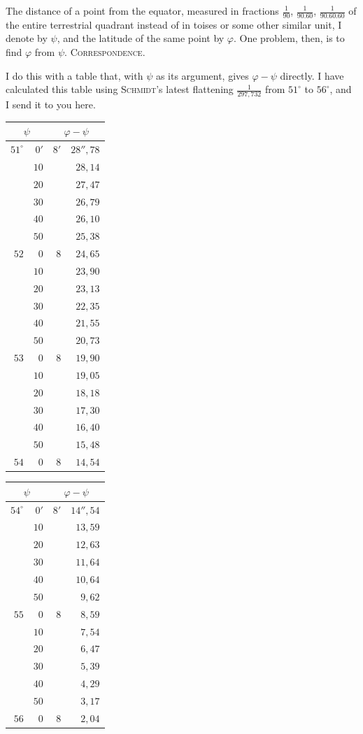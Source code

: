 The distance of a point from the equator, measured in fractions $\frac1{90}$, $\frac1{90.60}$, $\frac1{90.60.60}$ of the entire terrestrial quadrant instead of in toises or some other similar unit, I denote by $\psi$, and the latitude of the same point by $\varphi$. One problem, then, is to find $\varphi$ from $\psi$.
\clearpage
{}\hfill\textsc{Correspondence.}\hfill\mbox{}\par\medskip
I do this with a table that, with $\psi$ as its argument, gives $\varphi-\psi$ directly. I have calculated this table using \textsc{Schmidt}'s latest flattening $\frac1{297{,}732}$ from $51^\circ$ to $56^\circ$, and I send it to you here.
\begin{center}
\renewcommand{\arraystretch}{1.07}
\begin{tabular}[t]{|r@{\;}r|r@{\;}r|}
\hline
\multicolumn{2}{|c|}{$\psi$}&\multicolumn{2}{c|}{$\varphi-\psi$}\\\hline\hline
$51^\circ$&$0'$&$8'$&$28''{,}78$\\\hline
&$10$&&$28{,}14$\\
&$20$&&$27{,}47$\\
&$30$&&$26{,}79$\\
&$40$&&$26{,}10$\\
&$50$&&$25{,}38$\\
$52$&$0$&$8$&$24{,}65$\\\hline
&$10$&&$23{,}90$\\
&$20$&&$23{,}13$\\
&$30$&&$22{,}35$\\
&$40$&&$21{,}55$\\
&$50$&&$20{,}73$\\
$53$&$0$&$8$&$19{,}90$\\\hline
&$10$&&$19{,}05$\\
&$20$&&$18{,}18$\\
&$30$&&$17{,}30$\\
&$40$&&$16{,}40$\\
&$50$&&$15{,}48$\\
$54$&$0$&$8$&$14{,}54$
\end{tabular}
\hspace{2cm}
\begin{tabular}[t]{|r@{\;}r|r@{\;}r|}
\hline
\multicolumn{2}{|c|}{$\psi$}&\multicolumn{2}{c|}{$\varphi-\psi$}\\\hline\hline
$54^\circ$&$0'$&$8'$&$14''{,}54$\\\hline
&$10$&&$13{,}59$\\
&$20$&&$12{,}63$\\
&$30$&&$11{,}64$\\
&$40$&&$10{,}64$\\
&$50$&&$9{,}62$\\
$55$&$0$&$8$&$8{,}59$\\\hline
&$10$&&$7{,}54$\\
&$20$&&$6{,}47$\\
&$30$&&$5{,}39$\\
&$40$&&$4{,}29$\\
&$50$&&$3{,}17$\\
$56$&$0$&$8$&$2{,}04$
\end{tabular}
\end{center}
